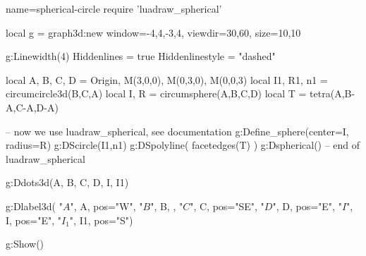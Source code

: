 \documentclass{standalone}
\begin{document}
\begin{luadraw}{name=spherical-circle}
require 'luadraw_spherical'

local g = graph3d:new{
  window={-4,4,-3,4},
  viewdir={30,60},
  size={10,10}
}

g:Linewidth(4)
Hiddenlines = true
Hiddenlinestyle = "dashed"

local A, B, C, D = Origin, M(3,0,0), M(0,3,0), M(0,0,3)
local I1, R1, n1 = circumcircle3d(B,C,A)
local I, R = circumsphere(A,B,C,D)
local T = tetra(A,B-A,C-A,D-A)

-- now we use luadraw_spherical, see documentation
g:Define_sphere({center=I, radius=R})
g:DScircle({I1,n1})
g:DSpolyline( facetedges(T) )
g:Dspherical()
-- end of luadraw_spherical

g:Ddots3d({A, B, C, D, I, I1})

g:Dlabel3d(
  "$A$", A, {pos="W"},
  "$B$", B, {},
  "$C$", C, {pos="SE"},
  "$D$", D, {pos="E"},
  "$I$", I, {pos="E"},
  "$I_1$", I1, {pos="S"})

g:Show()
\end{luadraw}
\end{document}
